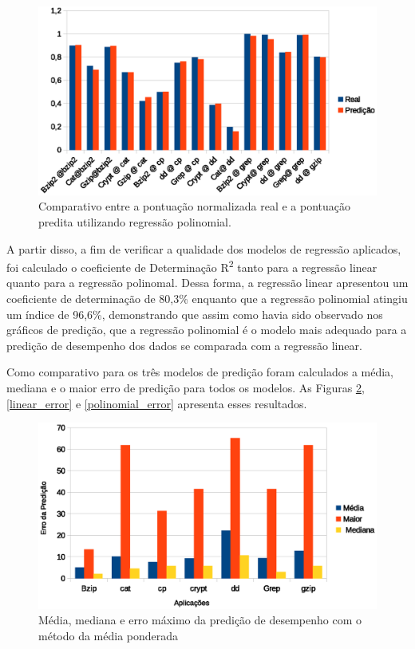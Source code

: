 \documentclass[[10pt,journal]{IEEEtran}
\begin{document}
\begin{figure}[!htb]
\centering
\includegraphics [keepaspectratio=true,scale=0.5]{graficos/poli.eps}
\caption{Comparativo entre a pontuação normalizada real e a pontuação predita utilizando regressão polinomial.}
\label{poli_predict}
\end{figure}  

A partir disso, a fim de verificar a qualidade dos modelos de regressão aplicados, foi calculado o coeficiente de Determinação R\textsuperscript{2} tanto para a regressão linear quanto para a regressão polinomal. Dessa forma, a regressão linear apresentou um coeficiente de determinação de 80,3\% enquanto que a regressão polinomial atingiu um índice de 96,6\%, demonstrando que assim como havia sido observado nos gráficos de predição, que a regressão polinomial é o modelo mais adequado para a predição de desempenho dos dados se comparada com a regressão linear.   

Como comparativo para os três modelos de predição foram calculados a média, mediana e o maior erro de predição para todos os modelos. As Figuras \ref{mean_error}, \ref{linear_error} e \ref{polinomial_error} apresenta esses resultados.

\begin{figure}[!htb]
\centering
\includegraphics [keepaspectratio=true,scale=0.5]{graficos/mean_error.eps}
\caption{Média, mediana e erro máximo da predição de desempenho com o método da média ponderada}
\label{mean_error}
\end{figure}  
\end{document}
